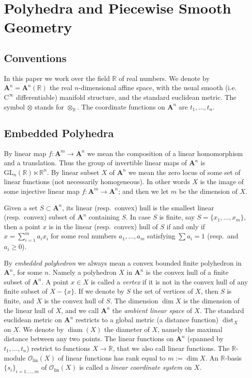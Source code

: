 \documentclass[10pt, a4paper]{amsart}
\theoremstyle{definition}
\numberwithin{equation}{section}
\newcommand{\opn}{\operatorname}
\newcommand{\mcal}[1]{\mathcal{#1}}
\newcommand{\mbf}[1]{\mathbf{#1}}
\newcommand{\mrm}[1]{\mathrm{#1}}
\newcommand{\mbb}[1]{\mathbb{#1}}
\newcommand{\R}{\mbb{R}}
\begin{document}
\cleardoublepage
\section{Polyhedra and Piecewise Smooth Geometry}
\label{sec:pws}

\subsection{Conventions}
In this paper we work over the field $\mbb{R}$ of
real numbers. We denote by $\mbf{A}^{n} = \mbf{A}^{n}(\R)$
the real $n$-dimensional affine
space, with the usual smooth (i.e.\ $\mrm{C}^{\infty}$
differentiable) manifold structure, and the standard euclidean metric. 
The symbol $\otimes$ stands for $\otimes_{\R}$.
The coordinate functions on
$\mbf{A}^{n}$ are $t_1, \ldots, t_n$.

\subsection{Embedded Polyhedra} \label{subsec:embpoly}
By linear map $f : \mbf{A}^{m} \to \mbf{A}^{n}$ we mean the composition of a
linear homomorphism and a translation. Thus the group of invertible linear
maps of $\mbf{A}^{n}$ is $\mrm{GL}_n(\R) \ltimes \R^{n}$. 
By linear subset $X$ of $\mbf{A}^{n}$ we mean the zero locus of some set of
linear functions (not necessarily homogeneous). In other words $X$ is the
image of some injective linear map
$f : \mbf{A}^{m} \to \mbf{A}^{n}$; and then we let $m$ be the dimension of $X$. 

Given a set $S \subset \mbf{A}^{n}$, its linear (resp.\ convex) hull is the 
smallest linear (resp.\ convex) subset of $\mbf{A}^{n}$ containing $S$.
In case $S$ is finite, say $S = \{ x_1, \ldots, x_m \}$, then a point $x$ is in
the linear (resp.\ convex) hull of $S$ if and only if 
$x = \sum_{i = 1}^m a_i x_i$ for some real numbers $a_1, \ldots, a_m$
satisfying $\sum a_i = 1$ (resp.\ and $a_i \geq 0$). 

By {\em embedded polyhedron}  
we always mean a convex bounded finite polyhedron
in $\mbf{A}^n$, for some $n$. Namely a polyhedron $X$ in $\mbf{A}^n$ is the
convex hull of a finite subset of $\mbf{A}^n$.
A point $x \in X$ is called a {\em vertex} if it is not in the convex hull of
any finite subset of $X - \{ x \}$. 
If we denote by $S$ the set  of vertices of $X$, then $S$ is finite, and
$X$ is the convex hull of $S$. 
The dimension $\opn{dim} X$ is the dimension of the linear hull of
$X$, and we call $\mbf{A}^n$ the {\em ambient linear space} of $X$.
The standard euclidean metric on $\mbf{A}^{n}$ restricts to a global metric (a
distance function) $\opn{dist}_X$ on $X$.
We denote by $\opn{diam}(X)$ the diameter of $X$, namely the maximal distance
between any two points.
The linear functions on $\mbf{A}^{n}$ (spanned by $t_1, \ldots, t_n$) restrict
to functions $X \to \R$, that we also call linear functions. The $\R$-module 
$\mcal{O}_{\mrm{lin}}(X)$ of linear functions has rank equal to 
$m := \opn{dim} X$. An $\R$-basis $\{ s_i \}_{i = 1, \ldots, m}$
of $\mcal{O}_{\mrm{lin}}(X)$ is called a {\em linear
coordinate system} on $X$. 
\end{document}
